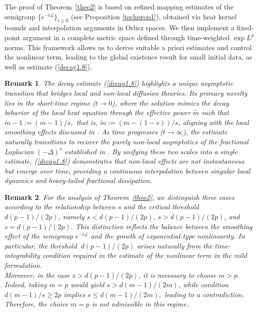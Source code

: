 \documentclass[a4paper,11pt]{amsart}
\renewcommand\eqref[1]{(\ref{#1})} %
\newtheorem{remark}{Remark}
\numberwithin{equation}{section}
\theoremstyle{plain}
\theoremstyle{definition}
\begin{document}
The proof of Theorem~\ref{theo2} is based on refined mapping estimates of the semigroup $\{e^{-t\mathcal{L}}\}_{t\geq 0}$ (see Proposition \ref{techprop1}), obtained via heat kernel bounds and interpolation arguments in Orlicz spaces. We then implement a fixed-point argument in a complete metric space defined through time-weighted $\exp L^{p}$ norms. This framework allows us to derive suitable a priori estimates and control the nonlinear term, leading to the global existence result for small initial data, as well as estimate \eqref{decay1.8}.


\begin{remark}
The decay estimate \eqref{decay1.8} highlights a unique asymptotic transition that bridges local and non-local diffusion theories. Its primary novelty lies in the short-time regime ($t \to 0$), where the solution mimics the decay behavior of the local heat equation through the effective power $\tilde{m}$ such that $\tilde{m}-1:= (m-1)/s,$ that is, $\tilde{m}:=(m-(1-s))/s$, aligning with the local smoothing effects discussed in \cite{Majdoub2,Majdoub3}. As time progresses ($t \to \infty$), the estimate naturally transitions to recover the purely non-local asymptotics of the fractional Laplacian $(-\Delta)^s$ established in \cite{FK20}. By unifying these two scales into a single estimate, \eqref{decay1.8} demonstrates that non-local effects are not instantaneous but emerge over time, providing a continuous interpolation between singular local dynamics and heavy-tailed fractional dissipation.
\end{remark}


\begin{remark}
For the analysis of Theorem~\ref {theo2}, we distinguish three cases according to the relationship between $s$ and the critical threshold $d(p-1)/(2 p)$, namely $s<d(p-1)/(2 p)$, $s>d(p-1)/(2 p)$, and $s=d(p-1)/(2 p)$.
This distinction reflects the balance between the smoothing effect of the semigroup $e^{-t\mathcal{L}}$ and the growth 
of exponential-type nonlinearity.  In particular, the threshold $~d(p-1)/(2p)$ arises naturally from the time-integrability condition required in the  estimate of the nonlinear term in the mild formulation.\\
 Moreover, in the case $s>d(p-1)/(2p)$, it is necessary to choose $m>p$. Indeed, taking $m=p$ would yield $s>d(m-1)/(2m)$, while condition $d(m-1)/s \ge 2p$ implies $s \le d(m-1)/(2m),$ leading to a contradiction. Therefore, the choice $m=p$ is not admissible in this regime.
\end{remark}
\end{document}
